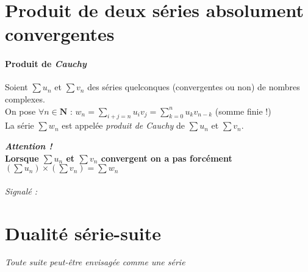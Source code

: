		\newpage 

\section{Produit de deux séries absolument convergentes}

		\vspace{-15pt}
		\traitd
		\paragraph{Produit de \emph{Cauchy}}
			Soient $\sum u_n$ et $\sum v_n$ des séries quelconques (convergentes ou non) de nombres complexes.\\
			On pose $\forall n \in \mathbf{N}$ : $w_n = \sum\limits_{i+j=n} u_i v_j = \sum_{k=0}^{n} u_k v_{n-k}$ (somme finie !) \\
			La série $\sum w_n$ est appelée \emph{produit de \emph{Cauchy}} de $\sum u_n$ et $\sum v_n$.
		\trait
				
		\textbf{\emph{Attention !} \\Lorsque $\sum u_n$ et $\sum v_n$ convergent on a pas forcément 
			$\left(\sum u_n \right) \times \left(\sum v_n \right) = \sum w_n$} \medskip \\
		
		 \medskip \\

		\textit{\small Signalé :} \\


		\medskip

	\section{Dualité série-suite}
		
		\textit{Toute suite peut-être envisagée comme une série}
			

